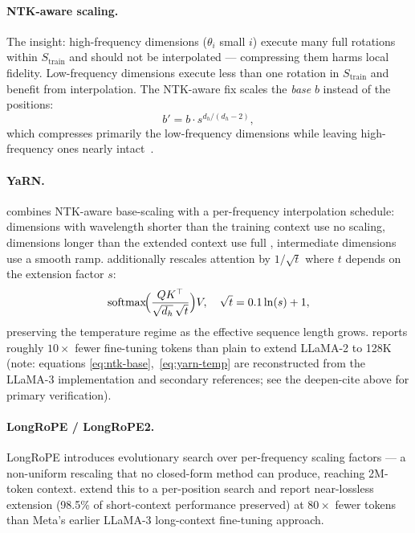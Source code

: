 \paragraph{NTK-aware scaling.} The insight: high-frequency dimensions
($\theta_i$ small $i$) execute many full rotations within $S_{\text{train}}$
and should not be interpolated --- compressing them harms local
fidelity. Low-frequency dimensions execute less than one rotation in
$S_{\text{train}}$ and benefit from interpolation. The NTK-aware fix
scales the \emph{base} $b$ instead of the positions:
\begin{equation}
b' = b \cdot s^{d_h / (d_h - 2)},
\label{eq:ntk-base}
\end{equation}
which compresses primarily the low-frequency dimensions while leaving
high-frequency ones nearly intact~\citep[\S 3.2,
\texttt{kb/notes/architecture/position-encoding.md\#sec-3-2}]{su2021}.

\paragraph{YaRN.}   combines
NTK-aware base-scaling with a per-frequency interpolation
schedule: dimensions with wavelength shorter than the training context
use no scaling, dimensions longer than the extended context use full
, intermediate dimensions use a smooth ramp.  additionally
rescales attention  by $1/\sqrt{t}$ where $t$ depends on the
extension factor $s$:
\begin{equation}
\operatorname{softmax}\!\Bigl(\frac{Q K^\top}{\sqrt{d_h}\,\sqrt{t}}\Bigr) V,
\quad \sqrt{t} = 0.1 \ln(s) + 1,
\label{eq:yarn-temp}
\end{equation}
preserving the  temperature regime as the effective sequence
length grows.  reports roughly $10\times$ fewer fine-tuning tokens
than plain  to extend LLaMA-2 to 128K (note: equations
\eqref{eq:ntk-base},~\eqref{eq:yarn-temp} are reconstructed from the
LLaMA-3 implementation and secondary references; see the deepen-cite
above for primary verification).

\paragraph{LongRoPE / LongRoPE2.} LongRoPE introduces evolutionary
search over per-frequency scaling factors --- a non-uniform rescaling
that no closed-form method can produce, reaching 2M-token context.
\citet{longrope2-2025} extend this to a per-position search and report
near-lossless extension (98.5\% of short-context performance preserved)
at $80\times$ fewer tokens than Meta's earlier LLaMA-3 long-context
fine-tuning approach.

